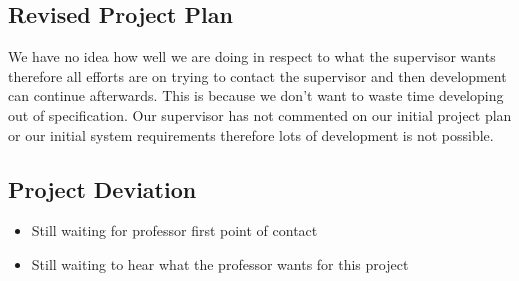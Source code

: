 \documentclass[11pt,]{article}
\providecommand{\tightlist}{%
  \setlength{\itemsep}{0pt}\setlength{\parskip}{0pt}}
\begin{document}
\subsection{Revised Project Plan}\label{revised-project-plan}

We have no idea how well we are doing in respect to what the supervisor
wants therefore all efforts are on trying to contact the supervisor and
then development can continue afterwards. This is because we don't want
to waste time developing out of specification. Our supervisor has not
commented on our initial project plan or our initial system requirements
therefore lots of development is not possible.

\subsection{Project Deviation}\label{project-deviation}

\begin{itemize}
\tightlist
\item
  Still waiting for professor first point of contact
\item
  Still waiting to hear what the professor wants for this project
\end{itemize}
\end{document}
